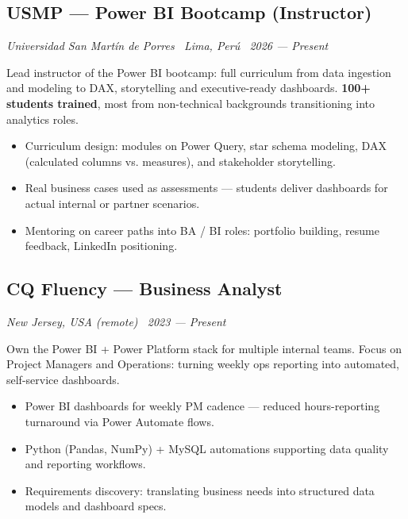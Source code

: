 \documentclass[10pt,letterpaper]{article}
\begin{document}
\subsection*{USMP --- Power BI Bootcamp (Instructor)}
\textcolor{accent}{\small\itshape Universidad San Martín de Porres \textperiodcentered\ Lima, Perú \textperiodcentered\ 2026 --- Present}
\vspace{4pt}

\noindent\textcolor{inkdim}{\small
Lead instructor of the Power BI bootcamp: full curriculum from data ingestion and modeling
to DAX, storytelling and executive-ready dashboards. \textbf{100+ students trained}, most from
non-technical backgrounds transitioning into analytics roles.
}
\vspace{2pt}
\begin{itemize}
  \item Curriculum design: modules on Power Query, star schema modeling, DAX (calculated columns vs. measures), and stakeholder storytelling.
  \item Real business cases used as assessments --- students deliver dashboards for actual internal or partner scenarios.
  \item Mentoring on career paths into BA / BI roles: portfolio building, resume feedback, LinkedIn positioning.
\end{itemize}
\vspace{6pt}

\subsection*{CQ Fluency --- Business Analyst}
\textcolor{accent}{\small\itshape New Jersey, USA (remote) \textperiodcentered\ 2023 --- Present}
\vspace{4pt}

\noindent\textcolor{inkdim}{\small
Own the Power BI + Power Platform stack for multiple internal teams. Focus on Project Managers
and Operations: turning weekly ops reporting into automated, self-service dashboards.
}
\vspace{2pt}
\begin{itemize}
  \item Power BI dashboards for weekly PM cadence --- reduced hours-reporting turnaround via Power Automate flows.
  \item Python (Pandas, NumPy) + MySQL automations supporting data quality and reporting workflows.
  \item Requirements discovery: translating business needs into structured data models and dashboard specs.
\end{itemize}
\end{document}
